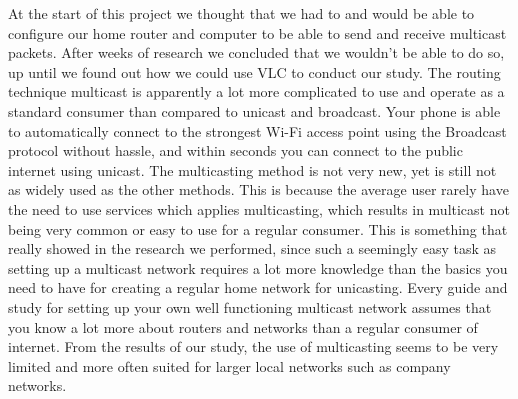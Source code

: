 \documentclass[9pt,a4paper]{acmproc}
\begin{document}
At the start of this project we thought that we had to and would be able to configure our home router and computer to be able to send and receive multicast packets. After weeks of research we concluded that we wouldn't be able to do so, up until we found out how we could use VLC to conduct our study. The routing technique multicast is apparently a lot more complicated to use and operate as a standard consumer than compared to unicast and broadcast. Your phone is able to automatically connect to the strongest Wi-Fi access point using the Broadcast protocol without hassle, and within seconds you can connect to the public internet using unicast. The multicasting method is not very new, yet is still not as widely used as the other methods. This is because the average user rarely have the need to use services which applies multicasting, which results in multicast not being very common or easy to use for a regular consumer. This is something that really showed in the research we performed, since such a seemingly easy task as setting up a multicast network requires a lot more knowledge than the basics you need to have for creating a regular home network for unicasting. Every guide and study for setting up your own well functioning multicast network assumes that you know a lot more about routers and networks than a regular consumer of internet. From the results of our study, the use of multicasting seems to be very limited and more often suited for larger local networks such as company networks.

\clearpage
\end{document}
